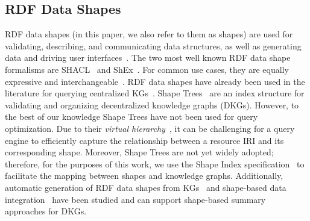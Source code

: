 


\subsection{RDF Data Shapes}
RDF data shapes (in this paper, we also refer to them as shapes) are used for validating, describing, and communicating data structures, as well as generating data and driving user interfaces~\cite{Gayo2018a,Gayo2018}.
The two most well known RDF data shape formalisms are SHACL~\cite{Gayo2018b} and ShEx~\cite{Gayo2018}.
For common use cases, they are equally expressive and interchangeable~\cite{Gayo2018c}.
RDF data shapes have already been used in the literature for querying centralized KGs~\cite{kashif2021, delva2023}.
Shape Trees~\cite{shapetreesShapeTrees} are an index structure for validating and organizing decentralized knowledge graphs (DKGs).
However, to the best of our knowledge Shape Trees have not been used for query optimization. 
Due to their \emph{virtual hierarchy}~\cite{shapetreesShapeTrees}, it can be challenging for a query engine to efficiently capture the relationship between a resource IRI and its corresponding shape. 
Moreover, Shape Trees are not yet widely adopted; therefore, for the purposes of this work, we use the Shape Index specification~\cite{tam2024opportunitiesshapebasedoptimizationlink} to facilitate the mapping between shapes and knowledge graphs. 
Additionally, automatic generation of RDF data shapes from KGs~\cite{fernandez2023extracting} and shape-based data integration~\cite{LabraGayo2023} have been studied and can support shape-based summary approaches for DKGs.


